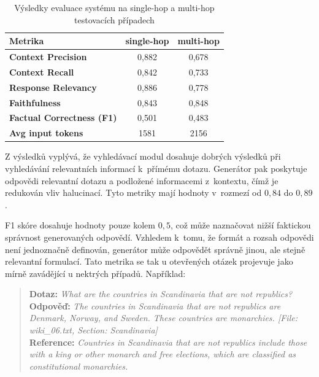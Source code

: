 \begin{table}[H]
    \centering
    \renewcommand{\arraystretch}{1.2}
    \begin{tabular}{|l|c|c|}
        \hline
        \textbf{Metrika} & \textbf{single-hop} & \textbf{multi-hop} \\
        \hline
        \textbf{Context Precision}         & 0{,}882 & 0{,}678 \\
        \textbf{Context Recall}            & 0{,}842 & 0{,}733 \\
        \textbf{Response Relevancy}        & 0{,}886 & 0{,}778 \\
        \textbf{Faithfulness}              & 0{,}843 & 0{,}848 \\
        \textbf{Factual Correctness (F1)}  & 0{,}501 & 0{,}483 \\
        \textbf{Avg input tokens}          & 1581 & 2156 \\
        \hline
    \end{tabular}
    \caption{Výsledky evaluace systému na single-hop a multi-hop testovacích případech}
    \label{tab:finaleval}
\end{table}

Z výsledků vyplývá, že vyhledávací modul dosahuje dobrých výsledků při vyhledávání relevantních informací k~přímému dotazu. Generátor pak poskytuje odpovědi relevantní dotazu a podložené informacemi z~kontextu, čímž je redukován vliv halucinací. Tyto metriky mají hodnoty v~rozmezí od $0{,}84$ do $0{,}89$.

F1 skóre dosahuje hodnoty pouze kolem $0{,}5$, což může naznačovat nižší faktickou správnost generovaných odpovědí. Vzhledem k~tomu, že formát a rozsah odpovědi není jednoznačně definován, generátor může odpovědět správně jinou, ale stejně relevantní formulací. Tato metrika se tak u otevřených otázek projevuje jako mírně zavádějící u nektrých případů. Například:

\begin{quote}
\textbf{Dotaz:} \textit{What are the countries in Scandinavia that are not republics?} \\
\textbf{Odpověď:} \textit{The countries in Scandinavia that are not republics are Denmark, Norway, and Sweden. These countries are monarchies. [File: wiki\_06.txt, Section: Scandinavia]} \\
\textbf{Reference:} \textit{Countries in Scandinavia that are not republics include those with a king or other monarch and free elections, which are classified as constitutional monarchies.} 
\end{quote}

